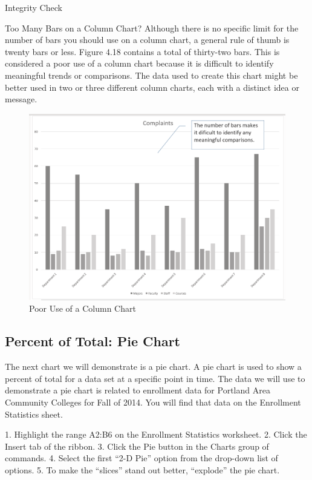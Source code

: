 Integrity Check

Too Many Bars on a Column Chart?
Although there is no specific limit for the number of bars you should use on a column chart, a general rule of thumb
is twenty bars or less. Figure 4.18 contains a total of thirty-two bars. This is considered a poor use of a column
chart because it is difficult to identify meaningful trends or comparisons. The data used to create this chart might
be better used in two or three different column charts, each with a distinct idea or message.



\begin{figure}[H]
	\centering
	\includegraphics[width=\maxwidth{.95\linewidth}]{gfx/ch04_fig21}
	\caption{Poor Use of a Column Chart}
	\label{04:fig21}
\end{figure}

\subsection{Percent of Total: Pie Chart}

The next chart we will demonstrate is a pie chart. A pie chart is used to show a percent of total for
a data set at a specific point in time. The data we will use to demonstrate a pie chart is related to
enrollment data for Portland Area Community Colleges for Fall of 2014. You will find that data on
the Enrollment Statistics sheet.

1.   Highlight the range A2:B6 on the Enrollment Statistics worksheet.
2.   Click the Insert tab of the ribbon.
3.   Click the Pie button in the Charts group of commands.
4.   Select the first “2-D Pie” option from the drop-down list of options.
5.   To make the “slices” stand out better, “explode” the pie chart.

